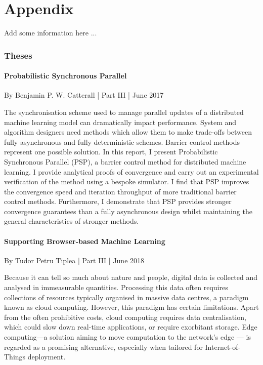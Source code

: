 \part{Appendix}

Add some information here ...


\hypertarget{Theses}{%
\section{Theses}\label{theses}}

\hypertarget{Probabilistic Synchronous Parallel}{%
\subsection{Probabilistic Synchronous Parallel}\label{theses-psp}}

By Benjamin P. W. Catterall | Part III | June 2017

The synchronisation scheme used to manage parallel updates of a distributed machine learning model can dramatically impact performance. System and algorithm designers need methods which allow them to make trade-offs between fully asynchronous and fully deterministic schemes. Barrier control methods represent one possible solution. In this report, I present Probabilistic Synchronous Parallel (PSP), a barrier control method for distributed machine learning. I provide analytical proofs of convergence and carry out an experimental verification of the method using a bespoke simulator. I find that PSP improves the convergence speed and iteration throughput of more traditional barrier control methods. Furthermore, I demonstrate that PSP provides stronger convergence guarantees than a fully asynchronous design whilst maintaining the general characteristics of stronger methods.


\hypertarget{Supporting Browser-based Machine Learning}{%
\subsection{Supporting Browser-based Machine Learning}\label{theses-webml}}

By Tudor Petru Tiplea | Part III | June 2018

Because it can tell so much about nature and people, digital data is collected and analysed in immeasurable quantities. Processing this data often requires collections of resources typically organised in massive data centres, a paradigm known as cloud computing. However, this paradigm has certain limitations. Apart from the often prohibitive costs, cloud computing requires data centralisation, which could slow down real-time applications, or require exorbitant storage. Edge computing—a solution aiming to move computation to the network's edge — is regarded as a promising alternative, especially when tailored for Internet-of-Things deployment.

